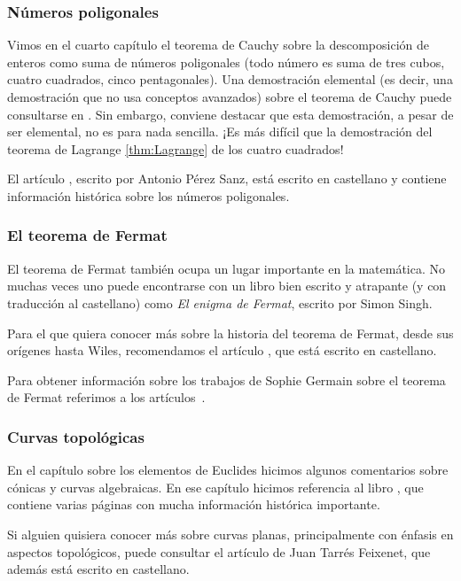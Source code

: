 \subsubsection*{Números poligonales}

Vimos en el cuarto capítulo el teorema de Cauchy 
sobre la descomposición de enteros como suma de números poligonales (todo número
es suma de tres cubos, cuatro cuadrados, cinco pentagonales). Una demostración
elemental (es decir, una demostración que no usa conceptos avanzados) 
sobre el teorema de Cauchy puede consultarse en \cite{MR866422}. Sin embargo,
conviene destacar que esta demostración, a pesar de ser elemental, no es
para nada sencilla. ¡Es más difícil que la demostración 
del teorema de Lagrange \ref{thm:Lagrange} de los cuatro cuadrados!

El artículo \cite{zbMATH06696438}, escrito por 
Antonio P{\'e}rez Sanz, está escrito en castellano y contiene información
histórica sobre los números poligonales. 

\subsubsection*{El teorema de Fermat}

El teorema de Fermat también ocupa un lugar importante en 
la matemática. No muchas veces uno puede encontrarse
con un libro bien escrito y atrapante (y con traducción al castellano) 
como \emph{El enigma de Fermat}, escrito por Simon Singh. 

Para
el que quiera conocer más sobre la historia del teorema
de Fermat, desde sus orígenes hasta Wiles, 
recomendamos el artículo \cite{corry_fermat}, que está escrito en castellano.  

Para obtener información sobre
los trabajos de Sophie Germain sobre el teorema de Fermat referimos a los
artículos~\cite{MR2415091,MR2735899}.

\subsubsection*{Curvas topológicas}

En el capítulo sobre los elementos de Euclides hicimos algunos
comentarios sobre cónicas y curvas algebraicas. En ese capítulo 
hicimos referencia al libro \cite{MR2975988}, que contiene
varias páginas con mucha información histórica importante. 

Si alguien 
quisiera conocer más sobre curvas planas, principalmente con énfasis 
en aspectos topológicos, 
puede consultar el artículo \cite{tf_curvas} de Juan Tarrés Feixenet, 
que además está escrito en castellano. 

